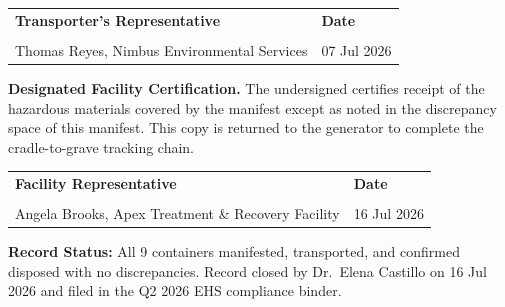 \vspace{10pt}

\noindent
\begin{tabularx}{\linewidth}{@{} X X @{}}
  \textbf{Transporter's Representative} & \textbf{Date} \\[16pt]
  \hrulefill & \hrulefill \\[4pt]
  Thomas Reyes, Nimbus Environmental Services & 07 Jul 2026 \\
\end{tabularx}

\vspace{14pt}


\vspace{6pt}

\begin{tcolorbox}[signoffbox]
  \small
  \textbf{Designated Facility Certification.} The undersigned certifies
  receipt of the hazardous materials covered by the manifest except as
  noted in the discrepancy space of this manifest. This copy is returned
  to the generator to complete the cradle-to-grave tracking chain.
\end{tcolorbox}

\vspace{10pt}

\noindent
\begin{tabularx}{\linewidth}{@{} X X @{}}
  \textbf{Facility Representative} & \textbf{Date} \\[16pt]
  \hrulefill & \hrulefill \\[4pt]
  Angela Brooks, Apex Treatment \& Recovery Facility & 16 Jul 2026 \\
\end{tabularx}

\vspace{14pt}

\begin{tcolorbox}[compliancebox]
  \faCheckCircle\quad \textbf{Record Status:} 
  \quad All 9 containers manifested, transported, and confirmed disposed
  with no discrepancies. Record closed by Dr.\ Elena Castillo on
  16 Jul 2026 and filed in the Q2 2026 EHS compliance binder.
\end{tcolorbox}

\vspace{10pt}


